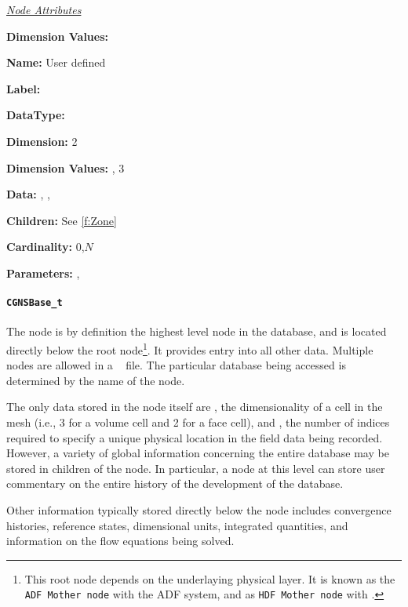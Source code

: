 \textit{\uline{Node Attributes}}
\begin{Ventryic}{\textbf{Dimension Values:}}
\item [\textbf{Name:}]
      User defined
\item [\textbf{Label:}]
\item [\textbf{DataType:}]
\item [\textbf{Dimension:}]
      2
\item [\textbf{Dimension Values:}]
      , 3
\item [\textbf{Data:}]
      , ,
\item [\textbf{Children:}]
      See \autoref{f:Zone}
\item [\textbf{Cardinality:}]
      0,$N$
\item [\textbf{Parameters:}]
      , 
\end{Ventryic}

\paragraph{\texttt{CGNSBase\_t}}

The  node is by definition the highest level node in
the database, and is located directly below the root node\footnote{This
root node depends on the underlaying physical layer.
It is known as the \texttt{ADF Mother node} with the ADF system, and as
\texttt{HDF Mother node} with \HDF.}.
It provides entry into all other data.
Multiple  nodes are allowed in a \SLL~  file.
The particular database being accessed is determined by the name
of the  node.

The only data stored in the node itself are , the
dimensionality of a cell in the mesh (i.e., 3 for a volume cell and 2
for a face cell), and , the number of indices
required to specify a unique physical location in the field data being
recorded. However, a variety of global information concerning the entire
database may be stored in children of the  node. In
particular, a  node at this level can store user
commentary on the entire history of the development of the database.

Other information typically stored directly below the 
node includes convergence histories, reference states, dimensional
units, integrated quantities, and information on the flow equations
being solved.


